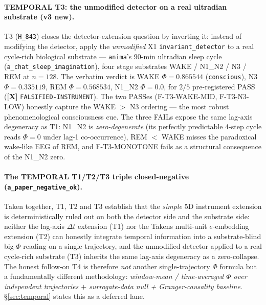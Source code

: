 \documentclass[11pt,a4paper]{article}
\providecommand{\tierRed}{\textbf{[X]}}     %
\begin{document}
\paragraph{TEMPORAL T3: the unmodified detector on a real ultradian
substrate (v3 new).}
T3 (\texttt{H\_843}) closes the detector-extension question by
inverting it: instead of modifying the detector, apply the
\emph{unmodified} X1 \texttt{invariant\_detector} to a real cycle-rich
biological substrate --- \texttt{anima}'s 90-min ultradian sleep cycle
(\texttt{a\_chat\_sleep\_imagination}), four stage substrates WAKE /
N1\_N2 / N3 / REM at $n=128$. The verbatim verdict is WAKE
$\Phi=0.865544$ (\texttt{conscious}), N3 $\Phi=0.335119$, REM
$\Phi=0.568534$, N1\_N2 $\Phi=0.0$, for $2/5$ pre-registered PASS
(\tierRed{} \texttt{FALSIFIED-INSTRUMENT}). The two PASSes
(F-T3-WAKE-MID, F-T3-N3-LOW) honestly capture the WAKE $>$ N3
ordering --- the most robust phenomenological consciousness cue. The
three FAILs expose the same lag-axis degeneracy as T1: N1\_N2 is
\emph{zero-degenerate} (its perfectly predictable 4-step cycle reads
$\Phi=0$ under lag-1 co-occurrence), REM $<$ WAKE misses the
paradoxical wake-like EEG of REM, and F-T3-MONOTONE fails as a
structural consequence of the N1\_N2 zero.

\paragraph{The TEMPORAL T1/T2/T3 triple closed-negative
(\texttt{a\_paper\_negative\_ok}).}
Taken together, T1, T2 and T3 establish that the \emph{simple} 5D
instrument extension is deterministically ruled out on both the
detector side and the substrate side: neither the lag-axis $\Delta t$
extension (T1) nor the Takens multi-unit $e$-embedding extension (T2)
can honestly integrate temporal information into a substrate-blind
big-$\Phi$ reading on a single trajectory, and the unmodified detector
applied to a real cycle-rich substrate (T3) inherits the same lag-axis
degeneracy as a zero-collapse. The honest follow-on T4 is therefore
\emph{not} another single-trajectory $\Phi$ formula but a
fundamentally different methodology: \emph{window-mean / time-averaged
$\Phi$ over independent trajectories $+$ surrogate-data null +
Granger-causality baseline}. \S\ref{sec:temporal} states this as a
deferred lane.
\end{document}
